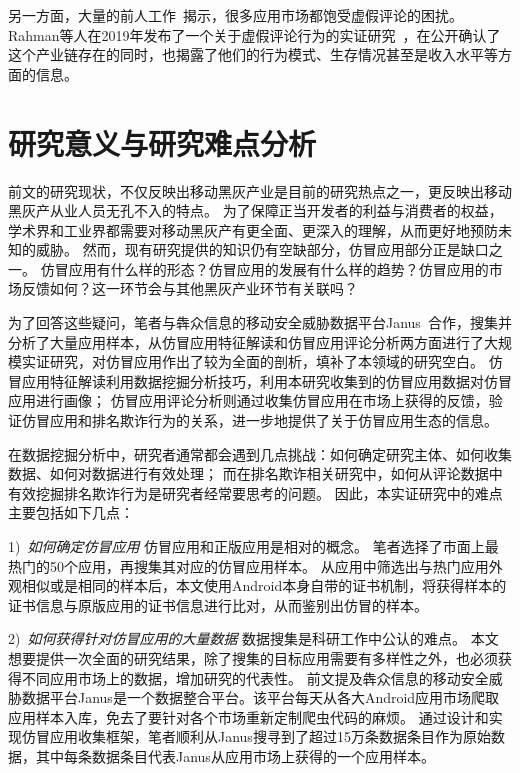 另一方面，大量的前人工作~\cite{hernandez2019the, xie2014grouptie, zhu2014discovery, hu2019want, chen2017toward, xie2016you, hooi2016fraudar}揭示，很多应用市场都饱受虚假评论的困扰。
Rahman等人在2019年发布了一个关于虚假评论行为的实证研究~\cite{rahman2019art}，在公开确认了这个产业链存在的同时，也揭露了他们的行为模式、生存情况甚至是收入水平等方面的信息。


\section{研究意义与研究难点分析}

前文的研究现状，不仅反映出移动黑灰产业是目前的研究热点之一，更反映出移动黑灰产从业人员无孔不入的特点。
为了保障正当开发者的利益与消费者的权益，学术界和工业界都需要对移动黑灰产有更全面、更深入的理解，从而更好地预防未知的威胁。
然而，现有研究提供的知识仍有空缺部分，仿冒应用部分正是缺口之一。
仿冒应用有什么样的形态？仿冒应用的发展有什么样的趋势？仿冒应用的市场反馈如何？这一环节会与其他黑灰产业环节有关联吗？

为了回答这些疑问，笔者与犇众信息的移动安全威胁数据平台Janus~\cite{janus}合作，搜集并分析了大量应用样本，从仿冒应用特征解读和仿冒应用评论分析两方面进行了大规模实证研究，对仿冒应用作出了较为全面的剖析，填补了本领域的研究空白。
仿冒应用特征解读利用数据挖掘分析技巧，利用本研究收集到的仿冒应用数据对仿冒应用进行画像；
仿冒应用评论分析则通过收集仿冒应用在市场上获得的反馈，验证仿冒应用和排名欺诈行为的关系，进一步地提供了关于仿冒应用生态的信息。

在数据挖掘分析中，研究者通常都会遇到几点挑战：如何确定研究主体、如何收集数据、如何对数据进行有效处理；
而在排名欺诈相关研究中，如何从评论数据中有效挖掘排名欺诈行为是研究者经常要思考的问题。
因此，本实证研究中的难点主要包括如下几点：

1)\	\emph{如何确定仿冒应用} \quad
仿冒应用和正版应用是相对的概念。
笔者选择了市面上最热门的50个应用，再搜集其对应的仿冒应用样本。
从应用中筛选出与热门应用外观相似或是相同的样本后，本文使用Android本身自带的证书机制，将获得样本的证书信息与原版应用的证书信息进行比对，从而鉴别出仿冒的样本。

2)\	\emph{如何获得针对仿冒应用的大量数据} \quad
数据搜集是科研工作中公认的难点。
本文想要提供一次全面的研究结果，除了搜集的目标应用需要有多样性之外，也必须获得不同应用市场上的数据，增加研究的代表性。
前文提及犇众信息的移动安全威胁数据平台Janus是一个数据整合平台。该平台每天从各大Android应用市场爬取应用样本入库，免去了要针对各个市场重新定制爬虫代码的麻烦。
通过设计和实现仿冒应用收集框架\mytool，笔者顺利从Janus搜寻到了超过15万条数据条目作为原始数据，其中每条数据条目代表Janus从应用市场上获得的一个应用样本。

